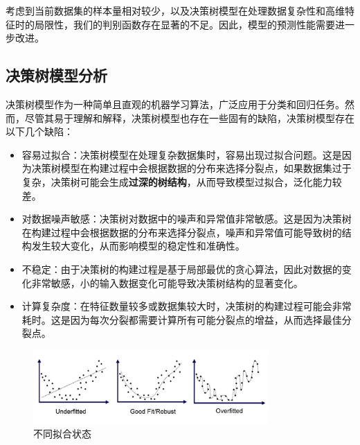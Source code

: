 考虑到当前数据集的样本量相对较少，以及决策树模型在处理数据复杂性和高维特征时的局限性，我们的判别函数存在显著的不足。因此，模型的预测性能需要进一步改进。
\subsection{决策树模型分析}
决策树模型作为一种简单且直观的机器学习算法，广泛应用于分类和回归任务。然而，尽管其易于理解和解释，决策树模型也存在一些固有的缺陷，决策树模型存在以下几个缺陷：
\begin{itemize}
	\item 容易过拟合：决策树模型在处理复杂数据集时，容易出现过拟合问题。这是因为决策树模型在构建过程中会根据数据的分布来选择分裂点，如果数据集过于复杂，决策树可能会生成\textbf{过深的树结构}，从而导致模型过拟合，泛化能力较差。

	\item 对数据噪声敏感：决策树对数据中的噪声和异常值非常敏感。这是因为决策树在构建过程中会根据数据的分布来选择分裂点，噪声和异常值可能导致树的结构发生较大变化，从而影响模型的稳定性和准确性。
	\item 不稳定：由于决策树的构建过程是基于局部最优的贪心算法，因此对数据的变化非常敏感，小的输入数据变化可能导致决策树结构的显著变化。
	\item 计算复杂度：在特征数量较多或数据集较大时，决策树的构建过程可能会非常耗时。这是因为每次分裂都需要计算所有可能分裂点的增益，从而选择最佳分裂点。
\end{itemize}
\begin{figure}[H]
	\centering
	\includegraphics[width=0.8\textwidth]{figures/fit_status.png}
	\caption{不同拟合状态}
	\label{fig:fit_status}
\end{figure}

